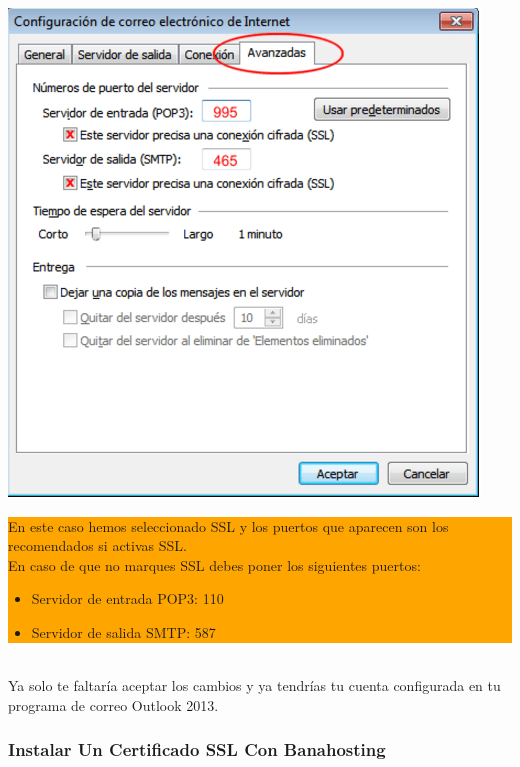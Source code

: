 \begin{enumerate}
			\begin{center}
				\includegraphics[scale=0.41]{image/outlook6.png}
			\end{center}
			
			\colorbox{orange}{\parbox{0.95\textwidth}{
					En este caso hemos seleccionado SSL y los puertos que aparecen son los recomendados si activas SSL.\\
					En caso de que no marques SSL debes poner los siguientes puertos:\\
					\begin{itemize}
						\item Servidor de entrada POP3: 110
						\item Servidor de salida SMTP: 587
					\end{itemize}
			}}\\
			
			Ya solo te faltaría aceptar los cambios y ya tendrías tu cuenta configurada en tu programa de correo Outlook 2013.
			
		\end{enumerate} 
		
		\newpage
		
		\subsubsection{Instalar Un Certificado SSL Con Banahosting}
		
